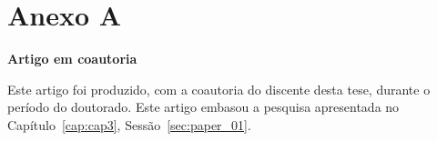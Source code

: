 \chapter{Anexo A}
\label{an:a}
\begin{center}
    \textbf{Artigo em coautoria}
\end{center}

Este artigo foi produzido, com a coautoria do discente desta tese, durante o período do doutorado. Este artigo embasou a pesquisa apresentada no Capítulo~\ref{cap:cap3}, Sessão~\ref{sec:paper_01}.



